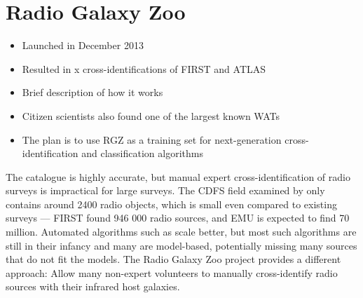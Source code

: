     \section{Radio Galaxy Zoo}
    \label{sec:radio-galaxy-zoo}

        \begin{itemize}
            \item Launched in December 2013
            \item Resulted in x cross-identifications of FIRST and ATLAS
            \item Brief description of how it works
            \item Citizen scientists also found one of the largest known WATs \cite{banfield16}
            \item The plan is to use RGZ as a training set for next-generation cross-identification and classification algorithms
        \end{itemize}

    The \citeauthor{norris06} catalogue is highly accurate, but manual expert
    cross-identification of radio surveys is impractical for large surveys. The
    CDFS field examined by \citeauthor{norris06} only contains around 2400 radio
    objects, which is small even compared to existing surveys --- FIRST
    \citep{becker95} found 946 000 radio sources, and EMU is expected to find 70
    million. Automated algorithms such as \citeauthor{fan15} scale better, but
    most such algorithms are still in their infancy \citeauthor{norris16} and
    many are model-based, potentially missing many sources that do not fit the
    models. The Radio Galaxy Zoo project \citep{banfield15} provides a different
    approach: Allow many non-expert volunteers to manually cross-identify radio
    sources with their infrared host galaxies.

